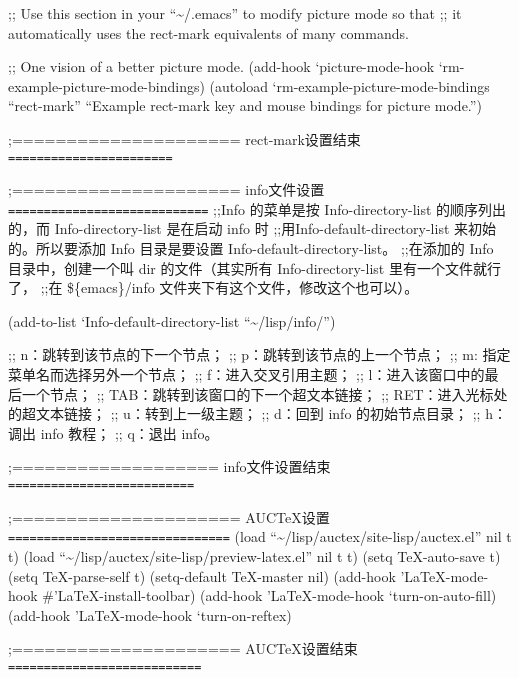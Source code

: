 \documentclass[11pt]{article}
\begin{document}
\begin{itemize}
;; Use this section in your ``\~{}/.emacs'' to modify picture mode so that
;; it automatically uses the rect-mark equivalents of many commands.

;; One vision of a better picture mode.
(add-hook `picture-mode-hook `rm-example-picture-mode-bindings)
(autoload `rm-example-picture-mode-bindings ``rect-mark''
  ``Example rect-mark key and mouse bindings for picture mode.'')

;=====================  rect-mark设置结束 \texttt{=======================}

;=====================  info文件设置 \texttt{============================}
;;Info 的菜单是按 Info-directory-list 的顺序列出的，而 Info-directory-list 是在启动 info 时
;;用Info-default-directory-list 来初始的。所以要添加 Info 目录是要设置 Info-default-directory-list。
;;在添加的 Info 目录中，创建一个叫 dir 的文件（其实所有 Info-directory-list 里有一个文件就行了，
;;在 \$\{emacs\}/info 文件夹下有这个文件，修改这个也可以）。

(add-to-list `Info-default-directory-list  ``\~{}/lisp/info/'')

;; n：跳转到该节点的下一个节点；           
;; p：跳转到该节点的上一个节点；
;; m: 指定菜单名而选择另外一个节点；
;; f：进入交叉引用主题；
;; l：进入该窗口中的最后一个节点；
;; TAB：跳转到该窗口的下一个超文本链接；
;; RET：进入光标处的超文本链接；
;; u：转到上一级主题；
;; d：回到 info 的初始节点目录；
;; h：调出 info 教程；
;; q：退出 info。

;===================  info文件设置结束 \texttt{==========================}


;===================== AUCTeX设置 \texttt{===============================}
(load ``\~{}/lisp/auctex/site-lisp/auctex.el'' nil t t)
(load ``\~{}/lisp/auctex/site-lisp/preview-latex.el'' nil t t)
(setq TeX-auto-save t)
(setq TeX-parse-self t)
(setq-default TeX-master nil)
(add-hook '\LaTeX{}-mode-hook \#'\LaTeX{}-install-toolbar)
(add-hook '\LaTeX{}-mode-hook `turn-on-auto-fill)
(add-hook '\LaTeX{}-mode-hook `turn-on-reftex)

;===================== AUCTeX设置结束 \texttt{===========================}



\end{itemize}
\end{document}
